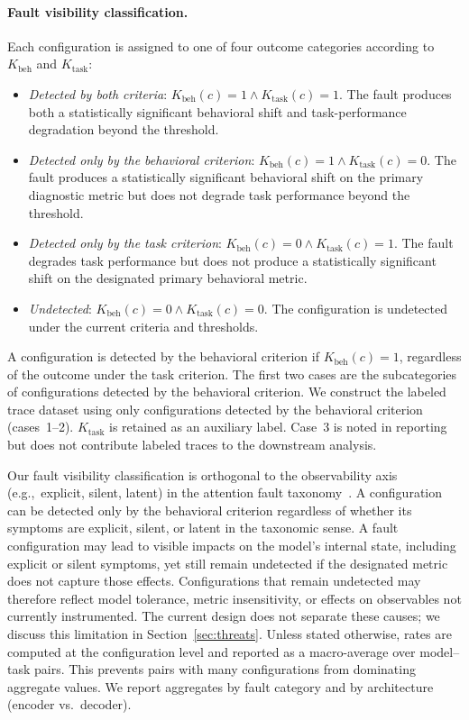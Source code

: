 \paragraph{Fault visibility classification.}
Each configuration is assigned to one of four outcome categories according to $K_{\text{beh}}$ and $K_{\text{task}}$:
\begin{itemize}[nosep]
\item \emph{Detected by both criteria}: $K_{\text{beh}}(c) = 1 \wedge K_{\text{task}}(c) = 1$. The fault produces both a statistically significant behavioral shift and task-performance degradation beyond the threshold.
\item \emph{Detected only by the behavioral criterion}: $K_{\text{beh}}(c) = 1 \wedge K_{\text{task}}(c) = 0$. The fault produces a statistically significant behavioral shift on the primary diagnostic metric but does not degrade task performance beyond the threshold.
\item \emph{Detected only by the task criterion}: $K_{\text{beh}}(c) = 0 \wedge K_{\text{task}}(c) = 1$. The fault degrades task performance but does not produce a statistically significant shift on the designated primary behavioral metric.
\item \emph{Undetected}: $K_{\text{beh}}(c) = 0 \wedge K_{\text{task}}(c) = 0$. The configuration is undetected under the current criteria and thresholds.
\end{itemize}
A configuration is detected by the behavioral criterion if $K_{\text{beh}}(c) = 1$, regardless of the outcome under the task criterion. The first two cases are the subcategories of configurations detected by the behavioral criterion. We construct the labeled trace dataset using only configurations detected by the behavioral criterion (cases~1--2). $K_{\text{task}}$ is retained as an auxiliary label. Case~3 is noted in reporting but does not contribute labeled traces to the downstream analysis.

Our fault visibility classification is orthogonal to the observability axis (e.g.,~explicit, silent, latent) in the attention fault taxonomy~\citep{ABNN_sigma}. A configuration can be detected only by the behavioral criterion regardless of whether its symptoms are explicit, silent, or latent in the taxonomic sense. A fault configuration may lead to visible impacts on the model's internal state, including explicit or silent symptoms, yet still remain undetected if the designated metric does not capture those effects. Configurations that remain undetected may therefore reflect model tolerance, metric insensitivity, or effects on observables not currently instrumented. The current design does not separate these causes; we discuss this limitation in Section~\ref{sec:threats}. Unless stated otherwise, rates are computed at the configuration level and reported as a macro-average over model--task pairs. This prevents pairs with many configurations from dominating aggregate values. We report aggregates by fault category and by architecture (encoder vs.\ decoder).

